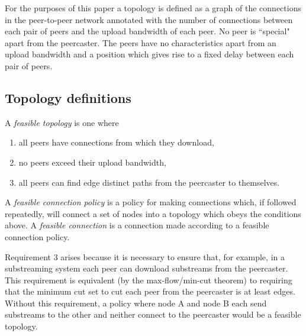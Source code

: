For the purposes of this paper a topology is defined as a graph of the connections
in the peer-to-peer network annotated with the number of connections between each
pair of peers and the upload bandwidth of each peer.  No peer is ``special" apart
from the peercaster.  The peers have no characteristics apart from an upload
bandwidth and a position which gives rise to a fixed delay between each pair of
peers.

\subsection{Topology definitions}

\begin{definition} \label{defn:feasible}
A {\em feasible topology\/} is one where
\begin{enumerate}
\item all peers have  connections from which they download,
\item no peers exceed their upload bandwidth,
\item all peers can find  edge distinct paths from the peercaster to themselves.
\end{enumerate}
A {\em feasible connection policy\/} is a policy for making connections which,
if followed repeatedly, will connect a set of nodes into a topology which obeys
the conditions above.  A {\em feasible connection\/} is a connection made
according to a feasible connection policy.
\end{definition}

\begin{remark}
Requirement 3 arises because it is necessary to ensure that, for example, in a
substreaming system each peer can download  substreams from the peercaster.
This requirement is equivalent (by the max-flow/min-cut theorem) to requiring
that the minimum cut set to cut each peer from the peercaster is at least  
edges.
Without this requirement, a policy where node A and node B each send  substreams
to the other and neither connect to the peercaster would be a feasible topology. 
\end{remark}

